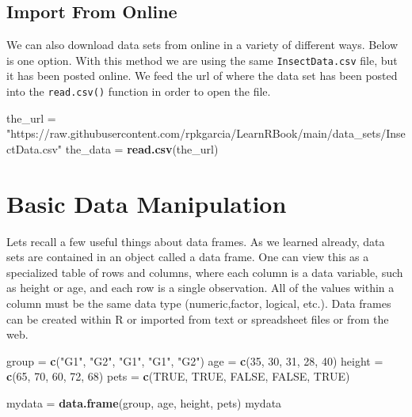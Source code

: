 \documentclass[
]{book}
\newenvironment{Shaded}{\begin{snugshade}}{\end{snugshade}}
\newcommand{\DecValTok}[1]{\textcolor[rgb]{0.00,0.00,0.81}{#1}}
\newcommand{\KeywordTok}[1]{\textcolor[rgb]{0.13,0.29,0.53}{\textbf{#1}}}
\newcommand{\NormalTok}[1]{#1}
\newcommand{\OtherTok}[1]{\textcolor[rgb]{0.56,0.35,0.01}{#1}}
\newcommand{\StringTok}[1]{\textcolor[rgb]{0.31,0.60,0.02}{#1}}
\begin{document}
\hypertarget{import-from-online}{%
\subsection*{Import From Online}\label{import-from-online}}

We can also download data sets from online in a variety of different ways. Below is one option. With this method we are using the same \texttt{InsectData.csv} file, but it has been posted online. We feed the url of where the data set has been posted into the \texttt{read.csv()} function in order to open the file.

\begin{Shaded}
\begin{Highlighting}[]
\NormalTok{the_url =}\StringTok{ "https://raw.githubusercontent.com/rpkgarcia/LearnRBook/main/data_sets/InsectData.csv"}
\NormalTok{the_data =}\StringTok{ }\KeywordTok{read.csv}\NormalTok{(the_url)}
\end{Highlighting}
\end{Shaded}

\hypertarget{basic-data-manipulation}{%
\section{Basic Data Manipulation}\label{basic-data-manipulation}}

Lets recall a few useful things about data frames. As we learned already, data sets are contained in an object called a data frame. One can view this as a specialized table of rows and columns, where each column is a data variable, such as height or age, and each row is a single observation. All of the values within a column must be the same data type (numeric,factor, logical, etc.). Data frames can be created within R or imported from text or spreadsheet files or from the web.

\begin{Shaded}
\begin{Highlighting}[]
\NormalTok{group =}\StringTok{ }\KeywordTok{c}\NormalTok{(}\StringTok{"G1"}\NormalTok{, }\StringTok{"G2"}\NormalTok{, }\StringTok{"G1"}\NormalTok{, }\StringTok{"G1"}\NormalTok{, }\StringTok{"G2"}\NormalTok{)}
\NormalTok{age =}\StringTok{ }\KeywordTok{c}\NormalTok{(}\DecValTok{35}\NormalTok{, }\DecValTok{30}\NormalTok{, }\DecValTok{31}\NormalTok{, }\DecValTok{28}\NormalTok{, }\DecValTok{40}\NormalTok{)}
\NormalTok{height =}\StringTok{ }\KeywordTok{c}\NormalTok{(}\DecValTok{65}\NormalTok{, }\DecValTok{70}\NormalTok{, }\DecValTok{60}\NormalTok{, }\DecValTok{72}\NormalTok{, }\DecValTok{68}\NormalTok{)}
\NormalTok{pets =}\StringTok{ }\KeywordTok{c}\NormalTok{(}\OtherTok{TRUE}\NormalTok{, }\OtherTok{TRUE}\NormalTok{, }\OtherTok{FALSE}\NormalTok{, }\OtherTok{FALSE}\NormalTok{, }\OtherTok{TRUE}\NormalTok{)}

\NormalTok{mydata =}\StringTok{ }\KeywordTok{data.frame}\NormalTok{(group, age, height, pets)}
\NormalTok{mydata}
\end{Highlighting}
\end{Shaded}
\end{document}
